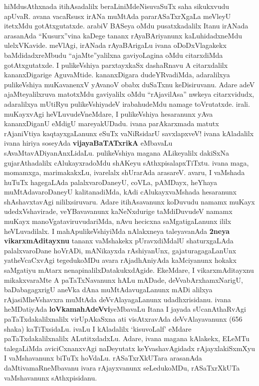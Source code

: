 \documentclass[11pt,a4size]{article}
\begin{document}
hiMdusAthxnada itihAsadalilx beraLiniMdeNisuvaSuTx saha sikukxvudu
apUvaR. avana vacaRsusx irANa muMtAda pararASaTxrXgaLa meVleyU
itetxMdu gotAtxgutatxde. arabiV BASeya oMdu pusatxkadalilx Itanu
irANada arasanAda ``Kusurx''vina kaDege tananx rAyaBAriyanunx
kaLuhidadxneMdu ulelxVKavide. meVlAgi, irANada rAyaBArigaLu ivana
oDoDxVlagakekx baMdidadxreMbudu ``ajaMte''yalilxna gaviyoLagina oMdu
citarxdiMda gotAtxgutatxde. I pulikeVshiya parxtayxkaSx dashaRnavu A
citarxdalilx kananxDigarige AguvaMtide. kananxDigara dudeYRvadiMda,
adaralilxya pulikeVshiya muKavanenxV yAvanoV obabx duSaTxnu
keDisiruvanu. Adare adeV ajaMteyalilxruva matotxMdu gaviyalilx oMdu
``rAjavilAsa'' nwkeya citarxvidudx, adaralilxya mUtiRyu
pulikeVshiyadeV irabahudeMdu namage toVrutatxde. irali. muKayxvAgi
heVLuvudeVneMdare, I pulikeVshiya hesaranunx yAva kananxDiganU eMdigU
mareyakUDadu. ivana parAkarxmada matutx rAjaniVtiya kaqtayxgaLanunx
eSuTx vaNiRsidarU savxlapxveV! ivana kAladalilx ivana hiriya soseyAda
\textbf{vijayaBaTATxrikA} eMbavaLu
sAvaMtavADiyanAnxLidaLu. pulikeVshiya magana ALikeyalilx dakiSxNa
gujarAthadalilx cAlukayxradoMdu shAKeyu sAthxpisalapxTiTxtu. ivana
maga, momamxga, marimakakxLu, ivarelalx shUrarAda arasareV. avaru, I
vaMshada huTuTx hagegaLAda palalxvaroDaneyU, coVLa, pAMDayx, heYhaya
muMtAdavaroDaneyU kalitanadiMda, kAdi cAlukayxvaMshada hesaranunx
shAshavxtavAgi nililxsiruvaru. Adare itihAsavanunx koDuvudu namamx
muKayx udedxVshavirade, veYBavavanunx kaNeNxdurige taMdiDuvudeV namamx
muKayx manoVgataviruvudariMda, nAvu hecicxna saMgatigaLanunx ililx
heVLuvadilalx. I mahApulikeVshiyiMda nAlakxneya taleyavanAda
\textbf{2neya vikarxmAditayxnu} tananx vaMshakekx pUravxdiMdalU
shaturxgaLAda palalxvaroDane hoVrADi, mANikayxda rAshiyanUnx,
gajaturagagaLanUnx yatheVcaCxvAgi tegedukoMDu avara rAjadhAniyAda
kaMciyanunx hokakx saMgatiyu mAtarx
nenapinalilxDatakukxdAgide. EkeMdare, I vikarxmAditayxnu mikakxvaraMte
A paTaTxNavanunx hALu mADade, deVvabArxhamxNarigU, baDabagagxrigU
aneVka dAna muMtAdavugaLanunx mADi alilxya rAjasiMheVshavxra muMtAda
deVvAlayagaLanunx udadhxrisidanu. ivana heMDatiyAda
\textbf{loVkamahAdeVvi}yeMbavaLu Itana I jayada sUcanAthaRvAgi
paTaTxdakalilxnalilx virUpAkaSxna ati visAtxravAda deVvAlayavanunx
(656 shaka) kaTiTxsidaLu. ivaLu I kAladalilx `kisuvoLalf' eMdare
paTaTxdakalilxnalilx ALutitxdadxLu. Adare, ivana magana kAlakekx,
ELeMTu talegaLiMda aviciCxnanxvAgi naDeyutatx keYvashavAgidadx
rAjayxlakiSxmXyu I vaMshavanunx biTuTx hoVdaLu. rASaTxrXkUTara
arasanAda daMtivamaRneMbavanu ivara rAjayxvanunx seLedukoMDu,
rASaTxrXkUTa vaMshavanunx sAthxpisidanu.
\end{document}
